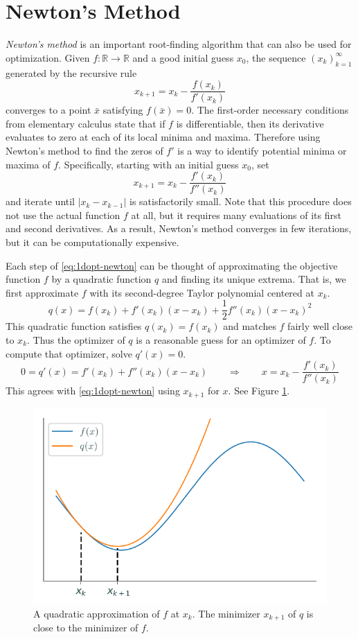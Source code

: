 \section*{Newton's Method} %

\emph{Newton's method} is an important root-finding algorithm that can also be used for optimization.
Given $f:\mathbb{R}\rightarrow\mathbb{R}$ and a good initial guess $x_0$, the sequence $(x_k)_{k=1}^\infty$ generated by the recursive rule
\[
x_{k+1} = x_k - \frac{f(x_k)}{f'(x_k)}
\]
converges to a point $\bar{x}$ satisfying $f(\bar{x}) = 0$.
The first-order necessary conditions from elementary calculus state that if $f$ is differentiable, then its derivative evaluates to zero at each of its local minima and maxima.
Therefore using Newton's method to find the zeros of $f'$ is a way to identify potential minima or maxima of $f$.
Specifically, starting with an initial guess $x_0$, set
\begin{equation}
x_{k+1} = x_k - \frac{f'(x_k)}{f''(x_k)}
\label{eq:1dopt-newton}
\end{equation}
and iterate until $|x_k - x_{k-1}|$ is satisfactorily small.
Note that this procedure does not use the actual function $f$ at all, but it requires many evaluations of its first and second derivatives.
As a result, Newton's method converges in few iterations, but it can be computationally expensive.

Each step of \eqref{eq:1dopt-newton} can be thought of approximating the objective function $f$ by a quadratic function $q$ and finding its unique extrema.
That is, we first approximate $f$ with its second-degree Taylor polynomial centered at $x_k$.
\[
q(x) = f(x_k) + f'(x_k) (x - x_k) + \frac{1}{2} f''(x_k) (x - x_k)^2
\]
This quadratic function satisfies $q(x_k) = f(x_k)$ and matches $f$ fairly well close to $x_k$.
Thus the optimizer of $q$ is a reasonable guess for an optimizer of $f$.
To compute that optimizer, solve $q'(x) = 0$.
\[
0 = q'(x) = f'(x_k) + f''(x_k)(x - x_k)
\qquad\Longrightarrow\qquad
x = x_k - \frac{f'(x_k)}{f''(x_k)}
\]
This agrees with \eqref{eq:1dopt-newton} using $x_{k+1}$ for $x$.
See Figure \ref{fig:1dopt-quadratic-newton}.

\begin{figure}[H]
\centering
\includegraphics[width = .7 \textwidth]{quad_approx.pdf}
\caption{A quadratic approximation of $f$ at $x_k$.
The minimizer $x_{k+1}$ of $q$ is close to the minimizer of $f$.
}
\label{fig:1dopt-quadratic-newton}
\end{figure}

